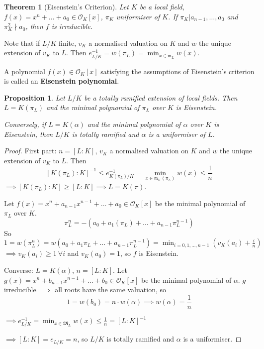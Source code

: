 \documentclass[a4paper]{article}
\newtheorem{theorem}[definition]{Theorem}
\newtheorem{prop}[definition]{Proposition}
\begin{document}
\begin{theorem}[Eisenstein's Criterion]
	Let $K$ be a local field,
	$f(x) = x^n + \dots + a_0 \in \mathcal{O}_K[x]$, $\pi_K$ uniformiser of $K$.
	If $\pi_K | a_{n-1}, \dots, a_0$ and $\pi_K^2 \nmid a_0$,
	then $f$ is irreducible.
\end{theorem}

Note that if $L/K$ finite, $v_K$ a normalised valuation on $K$ and $w$ the unique extension of $v_K$ to $L$.
Then $e_{L/K}^{-1} = w(\pi_L) = \min_{x \in \mathfrak{m}_L}w(x)$.

A polynomial $f(x) \in \mathcal{O}_K[x]$ satisfying the assumptions of Eisenstein's criterion is called an \textbf{Eisenstein polynomial}.

\begin{prop}
	Let $L/K$ be a totally ramified extension of local fields.
	Then $L=K(\pi_L)$ and the minimal polynomial of $\pi_L$ over $K$ is Eisenstein.
	
	Conversely, if $L=K(\alpha)$ and the minimal polynomial of $\alpha$ over $K$ is Eisenstein,
	then $L/K$ is totally ramified and $\alpha$ is a uniformiser of $L$.
\end{prop}
\begin{proof}
	First part: $n=[L:K]$, $v_K$ a normalised valuation on $K$ and $w$ the unique extension of $v_K$ to $L$.
	Then
	$$[K(\pi_L):K]^{-1} \leq e^{-1}_{K(\pi_L)/K} = \min_{x \in \mathfrak{m}_K(\pi_L)}w(x) \leq \frac{1}{n}$$
	$\implies [K(\pi_L):K] \geq [L:K] \implies L = K(\pi)$.
	
	Let $f(x)=x^n + a_{n-1}x^{n-1} + \dots + a_0 \in \mathcal{O}_K[x]$ be the minimal polynomial of $\pi_L$ over $K$.
	$$\pi_L^n = -(a_0 + a_1(\pi_L) + \dots + a_{n-1}\pi_L^{n-1})$$
	So $1= w(\pi_L^n) = w(a_0 + a_1 \pi_L + \dots + a_{n-1}\pi_L^{n-1}) = \min_{i=0,1,\dots,n-1}(v_K(a_i)+\frac{i}{n})$
	$\implies v_K(a_i) \geq 1\ \forall i$ and $v_K(a_0)=1$, so $f$ is Eisenstein.
	
	Converse: $L=K(\alpha)$, $n=[L:K]$.
	Let $g(x) = x^n + b_{n-1}x^{n-1}+ \dots + b_0 \in \mathcal{O}_K[x]$ be the minimal polynomial of $\alpha$.
	$g$ irreducible $\implies$ all roots have the same valuation, so
	$$1 = w(b_0) = n\cdot w(\alpha) \implies w(\alpha) = \frac{1}{n}$$
	
	$\implies e_{L/K}^{-1} = \min_{x \in \mathfrak{M}_L}w(x) \leq \frac{1}{n} = [L:K]^{-1}$
	
	$\implies [L:K] = e_{L/K} = n$, so $L/K$ is totally ramified and $\alpha$ is a uniformiser.
\end{proof}
\end{document}
